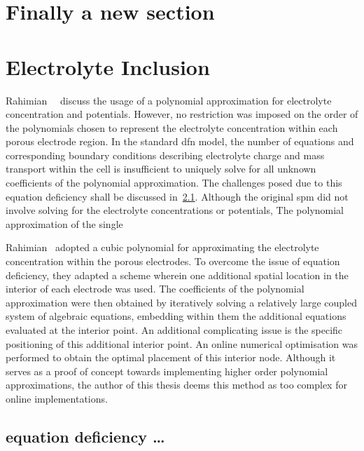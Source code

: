 \section{Finally a new section}
\section{Electrolyte Inclusion}

Rahimian~\etal{}~\cite{KhaleghiRahimian2013}  discuss  the  usage  of  a
polynomial approximation for electrolyte  concentration and potentials. However,
no restriction was  imposed on the order of the  polynomials chosen to represent
the  electrolyte  concentration within  each  porous  electrode region.  In  the
standard \gls{dfn}  model, the  number of  equations and  corresponding boundary
conditions describing electrolyte  charge and mass transport within  the cell is
insufficient to  uniquely solve for  all unknown coefficients of  the polynomial
approximation.  The  challenges posed  due  to  this equation  deficiency  shall
be  discussed  in~\cref{temp:eqndeficiency}.
Although  the original  \gls{spm} did  not involve  solving for  the electrolyte
concentrations or potentials, The polynomial approximation of the single


Rahimian~\etal{} adopted  a cubic  polynomial for approximating  the electrolyte
concentration within  the porous electrodes.  To overcome the issue  of equation
deficiency, they adapted a scheme wherein one additional spatial location in the
interior  of  each  electrode  was  used. The  coefficients  of  the  polynomial
approximation  were then  obtained  by iteratively  solving  a relatively  large
coupled  system of  algebraic equations,  embedding within  them the  additional
equations evaluated at  the interior point. An additional  complicating issue is
the specific positioning of this  additional interior point. An online numerical
optimisation  was performed  to obtain  the optimal  placement of  this interior
node. Although it serves as a proof of concept towards implementing higher order
polynomial approximations,  the author of this  thesis deems this method  as too
complex for online implementations.




\subsection{equation deficiency \dots}\label{temp:eqndeficiency}


